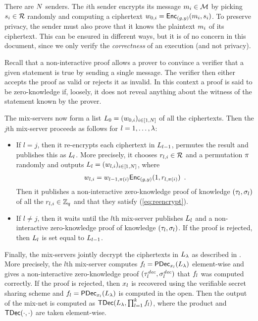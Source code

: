 \documentclass[11pt]{article}
\begin{document}
There are $N$ senders. The $i$th sender encrypts its message
$m_{i}\in\mathcal{M}$ by picking $s_{i}\in\mathcal{R}$ randomly and
computing a ciphertext
$w_{0,i}=\textsf{Enc}_{(g,y)}(m_{i},s_{i})$. To preserve
privacy, the sender must also prove that it knows the plaintext
$m_{i}$ of its ciphertext. This can be ensured in different ways,
but it is of no concern in this document, since we only verify the
\emph{correctness} of an execution (and not privacy).

Recall that a non-interactive proof allows a prover to convince a
verifier that a given statement is true by sending a single
message. The verifier then either accepts the proof as valid or
rejects it as invalid. In this context a proof is said to be
zero-knowledge if, loosely, it does not reveal anything about the
witness of the statement known by the prover.

The mix-servers now form a list
$L_{0}=(w_{0,i})_{i\in[1,N]}$ of all the ciphertexts. Then
the $j$th mix-server proceeds as follows for $l=1,\ldots,\lambda$:
\begin{itemize}

\item If $l=j$, then it re-encrypts each ciphertext in $L_{l-1}$,
  permutes the result and publishes this as $L_{l}$. More
  precisely, it chooses $r_{l,i}\in\mathcal{R}$ and a permutation
  $\pi$ randomly and outputs
  $L_{l}=(w_{l,i})_{i\in[1,N]}$, where
  \begin{align}
    w_{l,i}=w_{l-1,\pi(i)}\textsf{Enc}_{(g,y)}(1,r_{l,\pi(i)})\enspace.\label{eq:reencrypt}
  \end{align}
  Then it publishes a non-interactive zero-knowledge proof of
  knowledge $(\tau_{l},\sigma_{l})$ of all the
  $r_{l,i}\in\mathbb{Z}_{q}$ and that they satisfy (\ref{eq:reencrypt}).

\item If $l\neq j$, then it waits until the $l$th mix-server publishes
  $L_{l}$ and a non-interactive zero-knowledge proof of knowledge
  $(\tau_{l},\sigma_{l})$. If the proof is rejected, then $L_{l}$
  is set equal to $L_{l-1}$.

\end{itemize}

Finally, the mix-servers jointly decrypt the ciphertexts in
$L_{\lambda}$ as described in . More precisely, the
$l$th mix-server computes
$f_{l}=\textsf{PDec}_{x_{l}}(L_{\lambda})$ element-wise and gives a
non-interactive zero-knowledge proof $(\tau_{l}^{\mathit{dec}},\sigma_{l}^{\mathit{dec}})$ that
$f_{l}$ was computed correctly. If the proof is rejected, then
$x_{l}$ is recovered using the verifiable secret sharing scheme and
$f_{l}=\textsf{PDec}_{x_{l}}(L_{\lambda})$ is computed in the
open. Then the output of the mix-net is computed as
$\textsf{TDec}(L_{\lambda},\prod_{l=1}^{k}f_{l})$, where the
product and $\textsf{TDec}(\cdot,\cdot)$ are taken element-wise.
\end{document}
